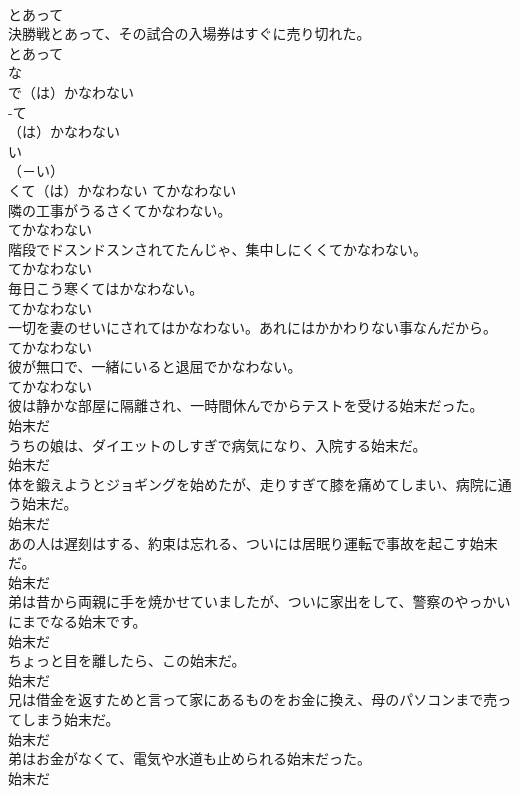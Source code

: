 \documentclass[8pt]{extreport}
\begin{document}
\begin{CJK}{UTF8}{min}
\\	とあって
\\	決勝戦とあって、その試合の入場券はすぐに売り切れた。	
\\	とあって
\\	な
\\	で（は）かなわない	
\\	-て
\\	（は）かなわない	
\\	い
\\	（－い） 
\\	くて（は）かなわない	てかなわない
\\	隣の工事がうるさくてかなわない。	
\\	てかなわない
\\	階段でドスンドスンされてたんじゃ、集中しにくくてかなわない。	
\\	てかなわない
\\	毎日こう寒くてはかなわない。	
\\	てかなわない
\\	一切を妻のせいにされてはかなわない。あれにはかかわりない事なんだから。	
\\	てかなわない
\\	彼が無口で、一緒にいると退屈でかなわない。	
\\	てかなわない
\\	彼は静かな部屋に隔離され、一時間休んでからテストを受ける始末だった。	
\\	始末だ
\\	うちの娘は、ダイエットのしすぎで病気になり、入院する始末だ。	
\\	始末だ
\\	体を鍛えようとジョギングを始めたが、走りすぎて膝を痛めてしまい、病院に通う始末だ。	
\\	始末だ
\\	あの人は遅刻はする、約束は忘れる、ついには居眠り運転で事故を起こす始末だ。	
\\	始末だ
\\	弟は昔から両親に手を焼かせていましたが、ついに家出をして、警察のやっかいにまでなる始末です。	
\\	始末だ
\\	ちょっと目を離したら、この始末だ。	
\\	始末だ
\\	兄は借金を返すためと言って家にあるものをお金に換え、母のパソコンまで売ってしまう始末だ。	
\\	始末だ
\\	弟はお金がなくて、電気や水道も止められる始末だった。	
\\	始末だ

\end{CJK}
\end{document}
